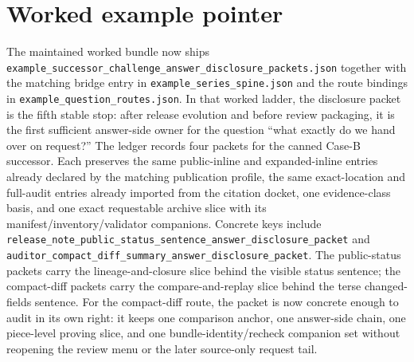 \documentclass[11pt]{article}
\begin{document}
\section{Worked example pointer}
The maintained worked bundle now ships \nolinkurl{example_successor_challenge_answer_disclosure_packets.json} together with the matching bridge entry in \nolinkurl{example_series_spine.json} and the route bindings in \nolinkurl{example_question_routes.json}. \cite{series:workedexample}
In that worked ladder, the disclosure packet is the fifth stable stop: after release evolution and before review packaging, it is the first sufficient answer-side owner for the question ``what exactly do we hand over on request?''
The ledger records four packets for the canned Case-B successor. Each preserves the same public-inline and expanded-inline entries already declared by the matching publication profile, the same exact-location and full-audit entries already imported from the citation docket, one evidence-class basis, and one exact requestable archive slice with its manifest/inventory/validator companions.
Concrete keys include \nolinkurl{release_note_public_status_sentence_answer_disclosure_packet} and \nolinkurl{auditor_compact_diff_summary_answer_disclosure_packet}. The public-status packets carry the lineage-and-closure slice behind the visible status sentence; the compact-diff packets carry the compare-and-replay slice behind the terse changed-fields sentence.
For the compact-diff route, the packet is now concrete enough to audit in its own right: it keeps one comparison anchor, one answer-side chain, one piece-level proving slice, and one bundle-identity/recheck companion set without reopening the review menu or the later source-only request tail.
\end{document}
